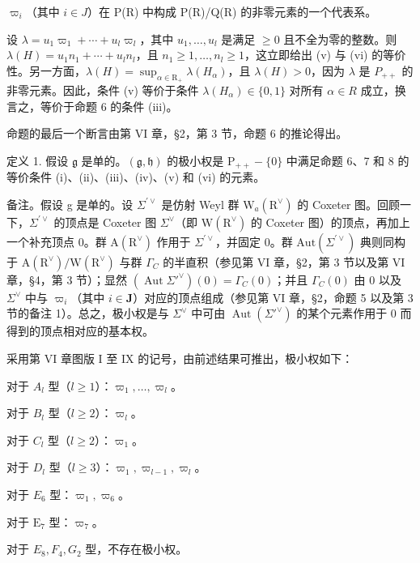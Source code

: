 \(\varpi_{i}\)（其中 \(i \in J\)）在 P(R) 中构成 P(R)/Q(R) 的非零元素的一个代表系。

设 \(\lambda = u_{1}\varpi_{1} + \cdots + u_{l}\varpi_{l}\)，其中 \(u_{1}, \ldots, u_{l}\) 是满足 \(\geq 0\) 且不全为零的整数。则 \(\lambda(H) = u_{1}n_{1} + \cdots + u_{l}n_{l}\)，且 \(n_{1} \geq 1, \ldots, n_{l} \geq 1\)，这立即给出 (v) 与 (vi) 的等价性。另一方面，\(\lambda(H) = \sup_{\alpha \in \mathrm{R}_{+}} \lambda(H_{\alpha})\)，且 \(\lambda(H) > 0\)，因为 \(\lambda\) 是 \(P_{++}\) 的非零元素。因此，条件 (v) 等价于条件 \(\lambda(H_{\alpha}) \in \{0, 1\}\) 对所有 \(\alpha \in R\) 成立，换言之，等价于命题 6 的条件 (iii)。

命题的最后一个断言由第 VI 章，§2，第 3 节，命题 6 的推论得出。

定义 1. 假设 \(\mathfrak{g}\) 是单的。\((\mathfrak{g},\mathfrak{h})\) 的极小权是 \(\mathrm{P}_{++} - \{0\}\) 中满足命题 6、7 和 8 的等价条件 (i)、(ii)、(iii)、(iv)、(v) 和 (vi) 的元素。

备注。假设 g 是单的。设 \(\Sigma^{\prime\vee}\) 是仿射 Weyl 群 \(\mathrm{W}_{a}(\mathrm{R}^{\vee})\) 的 Coxeter 图。回顾一下，\(\Sigma^{\prime\vee}\) 的顶点是 Coxeter 图 \(\Sigma^{\vee}\)（即 \(\mathrm{W}(\mathrm{R}^{\vee})\) 的 Coxeter 图）的顶点，再加上一个补充顶点 0。群 \(\mathrm{A}(\mathrm{R}^{\vee})\) 作用于 \(\Sigma^{\prime\vee}\)，并固定 0。群 \(\mathrm{Aut}(\Sigma^{\prime\vee})\) 典则同构于 \(\mathrm{A}(\mathrm{R}^{\vee})/\mathrm{W}(\mathrm{R}^{\vee})\) 与群 \(\Gamma_{C}\) 的半直积（参见第 VI 章，§2，第 3 节以及第 VI 章，§4，第 3 节）；显然 \((\operatorname{Aut} \Sigma'^{\vee})(0) = \Gamma_C(0)\)；并且 \(\Gamma_C(0)\) 由 0 以及 \(\Sigma^{\vee}\) 中与 \(\varpi_i\)（其中 \(i \in \mathbf{J}\)）对应的顶点组成（参见第 VI 章，§2，命题 5 以及第 3 节的备注 1）。总之，极小权是与 \(\Sigma^{\vee}\) 中可由 \(\operatorname{Aut}(\Sigma'^{\vee})\) 的某个元素作用于 0 而得到的顶点相对应的基本权。

采用第 VI 章图版 I 至 IX 的记号，由前述结果可推出，极小权如下：

对于 \(A_{l}\) 型（\(l \geq 1\)）：\(\varpi_{1}, \ldots, \varpi_{l}\)。

对于 \(B_{l}\) 型（\(l \geq 2\)）：\(\varpi_{l}\)。

对于 \(C_{l}\) 型（\(l \geq 2\)）：\(\varpi_{1}\)。

对于 \(D_{l}\) 型（\(l \geq 3\)）：\(\varpi_{1}, \varpi_{l-1}, \varpi_{l}\)。

对于 \(E_{6}\) 型：\(\varpi_{1}, \varpi_{6}\)。

对于 \(\mathrm{E}_7\) 型：\(\varpi_7\)。

对于 \(E_{8}, F_{4}, G_{2}\) 型，不存在极小权。

